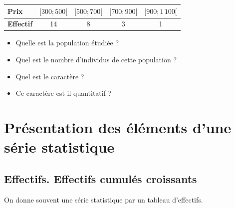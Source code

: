 \begin{minipage}[t]{1.0\linewidth}

\hspace{4.5em}
\begin{minipage}[t]{0.8\linewidth}
 

  {\centering
    \begin{tabular}[t]{|l|c|c|c|c|}
      \hline
      \textbf{Prix} & $[300;500[$ & $[500;700[$ & $[700;900[$ &
      $[900;1\,100[$ \\
      \hline
      \textbf{Effectif} & 14 & 8 & 3 & 1 \\
      \hline
    \end{tabular}
    \par}
  \bigskip

  \begin{itemize}
  \item Quelle est la population étudiée ? \\[1ex]
  \item Quel est le nombre d'individus de cette population ?\\[1ex]
  \item Quel est le caractère ? \\[1ex]
  \item Ce caractère est-il quantitatif ?
  \end{itemize}
  
\end{minipage}
\end{minipage}






\section{Présentation des éléments d'une série statistique}

\subsection{Effectifs. Effectifs cumulés croissants}

On donne souvent une série statistique par un tableau d'effectifs.

